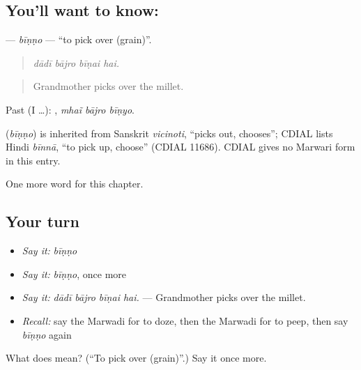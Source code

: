 \subsection*{You'll want to know: }
\textbf{} — \emph{bīṇṇo} — \textquotedblleft{}to pick over (grain)\textquotedblright{}.

\begin{quote}
   
\end{quote}

\begin{quote}
\emph{dādī bājro bīṇai hai.}
\end{quote}

\begin{quote}
Grandmother picks over the millet.
\end{quote}

Past (I …):   , \emph{mhaĩ bājro bīṇyo}.

\begin{cousinweb}
\textbf{} (\emph{bīṇṇo}) is inherited from Sanskrit \emph{vicinoti}, \textquotedblleft{}picks out, chooses\textquotedblright{}; CDIAL lists Hindi \emph{bīnnā}, \textquotedblleft{}to pick up, choose\textquotedblright{} (CDIAL 11686). CDIAL gives no Marwari form in this entry.
\end{cousinweb}

\begin{grammarlens}[title={What you've built}]
One more word for this chapter.
\end{grammarlens}

\subsection*{Your turn}
\begin{itemize}
\raggedright
  \item \emph{Say it:} \emph{bīṇṇo}
  \item \emph{Say it:} \emph{bīṇṇo}, once more
  \item \emph{Say it:} \emph{dādī bājro bīṇai hai.} — Grandmother picks over the millet.
  \item \emph{Recall:} say the Marwadi for to doze, then the Marwadi for to peep, then say \emph{bīṇṇo} again
\end{itemize}

\begin{tcolorbox}[breakable,colback=teal!4,colframe=teal!35!black,title={Before you move on}]
What does  mean? (\textquotedblleft{}To pick over (grain)\textquotedblright{}.) Say it once more.
\end{tcolorbox}
